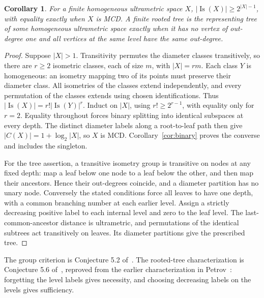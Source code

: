 \documentclass[11pt]{article}
\newtheorem{corollary}[theorem]{Corollary}
\begin{document}
\begin{corollary}\label{cor:homogeneous}
For a finite homogeneous ultrametric space $X$,
$|\operatorname{Is}(X)|\ge2^{|X|-1}$, with equality exactly when
$X$ is MCD. A finite rooted tree is the representing tree of some
homogeneous ultrametric space exactly when it has no vertex of
out-degree one and all vertices at the same level have the same
out-degree.
\end{corollary}
\begin{proof}
Suppose $|X|>1$. Transitivity permutes the diameter classes
transitively, so there are $r\ge2$ isometric classes, each of size
$m$, with $|X|=rm$. Each class $Y$ is homogeneous: an isometry
mapping two of its points must preserve their diameter class.
All isometries of the classes extend independently, and every
permutation of the classes extends using chosen identifications.
Thus $|\operatorname{Is}(X)|=r!|\operatorname{Is}(Y)|^r$.
Induct on $|X|$, using $r!\ge2^{r-1}$, with equality only for $r=2$.
Equality throughout forces binary splitting into identical subspaces
at every depth. The distinct diameter labels along a root-to-leaf
path then give $|C(X)|=1+\log_2|X|$, so $X$ is MCD.
Corollary~\ref{cor:binary} proves the converse and includes the singleton.

For the tree assertion, a transitive isometry group is transitive
on nodes at any fixed depth: map a leaf below one node to a leaf
below the other, and then map their ancestors. Hence their
out-degrees coincide, and a diameter partition has no unary node.
Conversely the stated conditions force all leaves to have one
depth, with a common branching number at each earlier level.
Assign a strictly decreasing positive label to each internal level
and zero to the leaf level. The last-common-ancestor distance is
ultrametric, and permutations of the identical subtrees act
transitively on leaves. Its diameter partitions give the prescribed tree.
\end{proof}
The group criterion is Conjecture 5.2 of~\cite[p.~27]{BT}.
The rooted-tree characterization is Conjecture 5.6 of~\cite[pp.~27--28]{BT},
reproved from the earlier characterization in
Petrov~\cite[Theorem 2.2, pp.~6--7]{P}: forgetting the level labels
gives necessity, and choosing decreasing labels on the levels gives
sufficiency.
\end{document}
